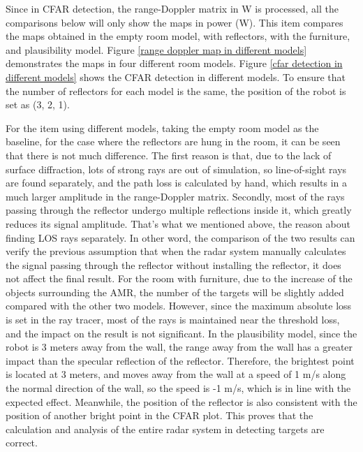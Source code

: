 \documentclass[12pt,DIV14,BCOR12mm,a4paper,footinclude=false,headinclude,parskip=half-,twoside,openright,cleardoublepage=empty,toc=index,bibliography=totoc,listof=totoc]{scrreprt}
\numberwithin{equation}{chapter}
\begin{document}
Since in CFAR detection, the range-Doppler matrix in W is processed, all the comparisons below will only show the maps in power (W). This item compares the maps obtained in the empty room model, with reflectors, with the furniture, and plausibility model. Figure \ref{range doppler map in different models} demonstrates the maps in four different room models. Figure \ref{cfar detection in different models} shows the CFAR detection in different models. To ensure that the number of reflectors for each model is the same, the position of the robot is set as (3, 2, 1).

For the item using different models, taking the empty room model as the baseline, for the case where the reflectors are hung in the room, it can be seen that there is not much difference. The first reason is that, due to the lack of surface diffraction, lots of strong rays are out of simulation, so line-of-sight rays are found separately, and the path loss is calculated by hand, which results in a much larger amplitude in the range-Doppler matrix. Secondly, most of the rays passing through the reflector undergo multiple reflections inside it, which greatly reduces its signal amplitude. That's what we mentioned above, the reason about finding LOS rays separately. In other word, the comparison of the two results can verify the previous assumption that when the radar system manually calculates the signal passing through the reflector without installing the reflector, it does not affect the final result. For the room with furniture, due to the increase of the objects surrounding the AMR, the number of the targets will be slightly added compared with the other two models. However, since the maximum absolute loss is set in the ray tracer, most of the rays is maintained near the threshold loss, and the impact on the result is not significant. In the plausibility model, since the robot is 3 meters away from the wall, the range away from the wall has a greater impact than the specular reflection of the reflector. Therefore, the brightest point is located at 3 meters, and moves away from the wall at a speed of 1 m/s along the normal direction of the wall, so the speed is -1 m/s, which is in line with the expected effect. Meanwhile, the position of the reflector is also consistent with the position of another bright point in the CFAR plot. This proves that the calculation and analysis of the entire radar system in detecting targets are correct.
\end{document}
